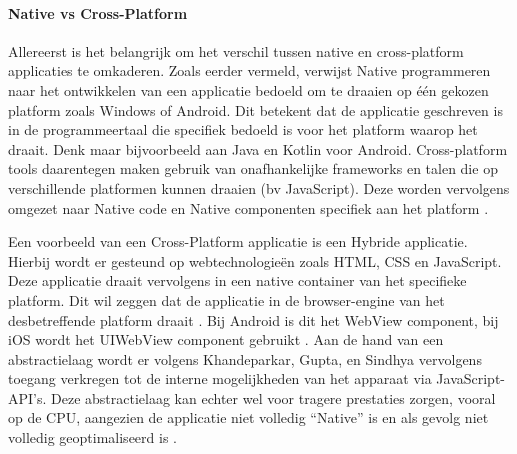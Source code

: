 \paragraph{Native vs Cross-Platform}
\newline
Allereerst is het belangrijk om het verschil tussen native en cross-platform applicaties te omkaderen. Zoals eerder vermeld, verwijst Native programmeren naar het ontwikkelen van een applicatie bedoeld om te draaien op één gekozen platform zoals Windows of Android. Dit betekent dat de applicatie geschreven is in de programmeertaal die specifiek bedoeld is voor het platform waarop het draait. Denk maar bijvoorbeeld aan Java en Kotlin voor Android. Cross-platform tools daarentegen maken gebruik van onafhankelijke frameworks en talen die op verschillende platformen kunnen draaien (bv JavaScript). Deze worden vervolgens omgezet naar Native code en Native componenten specifiek aan het platform \autocite{Bron2}.

Een voorbeeld van een Cross-Platform applicatie is een Hybride applicatie. Hierbij wordt er gesteund op webtechnologieën zoals HTML, CSS en JavaScript. Deze applicatie draait vervolgens in een native container van het specifieke platform. Dit wil zeggen dat de applicatie in de browser-engine van het desbetreffende platform draait \autocite{Bron6}. Bij Android is dit het WebView component, bij iOS wordt het UIWebView component gebruikt \autocite{Bron4}. Aan de hand van een abstractielaag wordt er volgens Khandeparkar, Gupta, en Sindhya \textcite{Bron6} vervolgens toegang verkregen tot de interne mogelijkheden van het apparaat via JavaScript-API's. Deze abstractielaag kan echter wel voor tragere prestaties zorgen, vooral op de CPU, aangezien de applicatie niet volledig ``Native'' is en als gevolg niet volledig geoptimaliseerd is \autocite{Bron1}.

